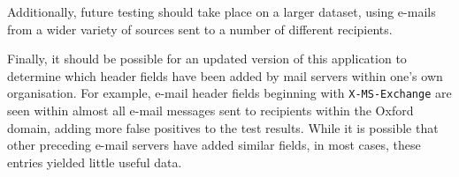 Additionally, future testing should take place on a larger dataset, using
e-mails from a wider variety of sources sent to a number of different
recipients.  

Finally, it should be possible for an updated version of this application to
determine which header fields have been added by mail servers within one's own
organisation.  For example, e-mail header fields beginning with
\texttt{X-MS-Exchange} are seen within almost all e-mail messages sent to
recipients within the Oxford domain, adding more false positives to the test
results. While it is possible that other preceding e-mail servers have added
similar fields, in most cases, these entries yielded little useful data.

